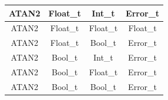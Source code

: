 \begin{figure}[H]
\begin{tabular}{cccc}
        \midrule ATAN2 & Float\_t & Int\_t    & Error\_t \\
        \midrule ATAN2 & Float\_t & Float\_t  & Float\_t \\
        \midrule ATAN2 & Float\_t & Bool\_t   & Error\_t \\

        \midrule ATAN2 & Bool\_t & Int\_t     & Error\_t \\
        \midrule ATAN2 & Bool\_t & Float\_t   & Error\_t \\
        \midrule ATAN2 & Bool\_t & Bool\_t    & Error\_t \\

        \bottomrule
    \end{tabular}\\
\end{figure}

\newpage


